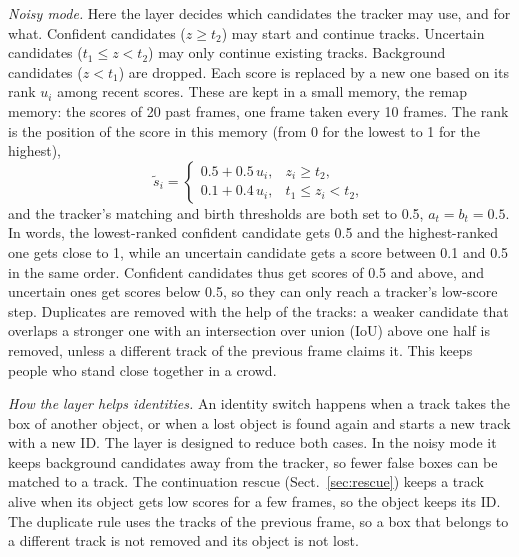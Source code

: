 \documentclass[pdflatex,sn-mathphys-num,iicol]{sn-jnl}
\begin{document}
\emph{Noisy mode.} Here the layer decides which candidates the tracker may
use, and for what. Confident candidates ($z\ge t_2$) may start and continue
tracks. Uncertain candidates ($t_1\le z<t_2$) may only continue existing
tracks. Background candidates ($z<t_1$) are dropped. Each score is replaced
by a new one based on its rank $u_i$ among recent scores. These are kept in a
small memory, the remap memory: the scores of 20 past frames, one frame taken
every 10 frames. The rank is the position of the score in this memory (from 0 for the
lowest to 1 for the highest),
\begin{equation}
\tilde{s}_i=
\begin{cases}
0.5+0.5\,u_i, & z_i\ge t_2,\\
0.1+0.4\,u_i, & t_1\le z_i<t_2,
\end{cases}
\label{eq:remap}
\end{equation}
and the tracker's matching and birth thresholds are both set to 0.5,
$a_t=b_t=0.5$. In words, the lowest-ranked confident candidate gets 0.5 and
the highest-ranked one gets close to 1, while an uncertain candidate gets a
score between 0.1 and 0.5 in the same order. Confident candidates thus get
scores of 0.5 and above, and
uncertain ones get scores below 0.5, so they can only reach a tracker's
low-score step. Duplicates are removed with the help of the tracks: a weaker
candidate that overlaps a stronger one with an intersection over union (IoU)
above one half is removed, unless a different track of the previous frame
claims it. This keeps people who stand close together in a crowd.

\emph{How the layer helps identities.} An identity switch happens when a track
takes the box of another object, or when a lost object is found again and
starts a new track with a new ID. The layer is designed to reduce both cases.
In the noisy mode it keeps background candidates away from the tracker, so
fewer false boxes can be matched to a track. The continuation rescue
(Sect.~\ref{sec:rescue}) keeps a track alive when its object gets low scores
for a few frames, so the object keeps its ID. The duplicate rule uses the
tracks of the previous frame, so a box that belongs to a different track is
not removed and its object is not lost.
\end{document}
